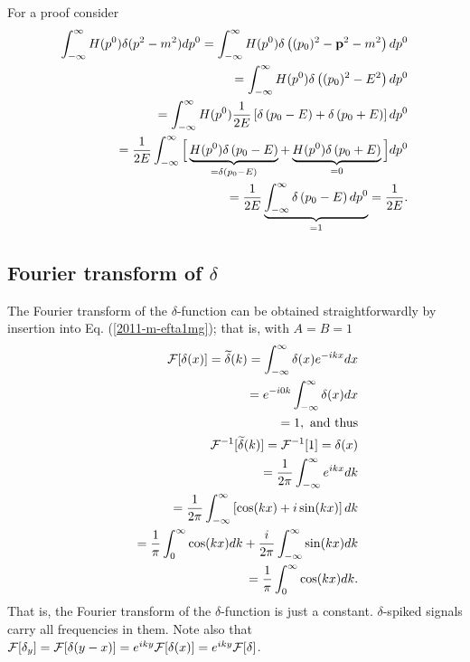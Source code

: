 {\color{OliveGreen}
\bproof
For a proof consider
 \begin{equation}
 \begin{split}
\int_{-\infty}^\infty     H (p^0)\delta (p^2-m^2)  dp^0
=
\int_{-\infty}^\infty    H (p^0)\delta \left((p_0)^2-{\bf p}^2-m^2\right) dp^0\\
=
\int_{-\infty}^\infty   H (p^0)\delta \left((p_0)^2-E^2\right)  dp^0  \\
=
\int_{-\infty}^\infty   H (p^0)\frac{1}{2E} \left[\delta \left( p_0 - E \right) + \delta \left( p_0 + E \right) \right]  dp^0 \\
=
\frac{1}{2E} \int_{-\infty}^\infty   \Big[\underbrace{H (p^0) \delta \left( p_0 - E \right)}_{=\delta \left( p_0 - E \right)}
 +
\underbrace{H (p^0) \delta \left( p_0 + E \right)}_{=0}
\Big] dp^0\\
=  \frac{1}{2E} \underbrace{\int_{-\infty}^\infty   \delta \left( p_0 - E \right)  dp^0}_{=1} =\frac{1}{2E}
.
\end{split}
 \end{equation}
\eproof
}


\subsection{Fourier transform  of $\delta$}
The Fourier transform of the $\delta$-function can be obtained straightforwardly
by insertion into Eq. (\ref{2011-m-efta1mg}); that is,
with $A=B=1$
\begin{equation}
\begin{split}
  {\cal F}[\delta (x)]=\widetilde{\delta}(k)=   \int_{-\infty}^\infty  \delta(x) e^{-i{kx}} dx   \\
\qquad =    e^{-i{0k}}  \int_{-\infty}^\infty  \delta(x)  dx   \\
\qquad =    1, \textrm{ and thus}
\\
 {\cal F}^{-1}[\widetilde{\delta} (k)]=
 {\cal F}^{-1}[1]=\delta (x)  \\
\qquad = \frac{1}{2\pi}  \int_{-\infty}^\infty    e^{i{kx}} dk\\
\qquad =
\frac{1}{2\pi}  \int_{-\infty}^\infty  \left[  \cos(kx)+ i \sin(kx) \right] dk\\
\qquad =
\frac{1}{ \pi}  \int_{0}^\infty    \cos(kx) dk   +
\frac{ i }{2\pi}  \int_{-\infty}^\infty   \sin(kx)   dk\\
\qquad =
\frac{1}{ \pi}  \int_{0}^\infty    \cos(kx) dk
.
\end{split}
\label{2011-m-eftdelta}
\end{equation}
That is, the Fourier transform of the $\delta$-function is just a constant.
$\delta$-spiked signals carry all frequencies in them.
Note also that  ${\cal F}[\delta_y ]={\cal F}[\delta  (y-x)]=e^{i{ky}}{\cal F}[\delta (x)]=e^{i{ky}}{\cal F}[\delta ]$.

